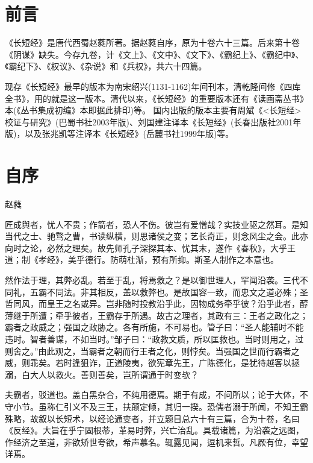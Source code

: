 \chapter*{前言}
《长短经》是唐代西蜀赵蕤所著。据赵蕤自序，原为十卷六十三篇。后来第十卷《阴谋》缺失。今存九卷，计《文上》、《文中》、《文下》、《霸纪上》、《霸纪中》、《霸纪下》、《权议》、《杂说》和《兵权》，共六十四篇。

现存《长短经》最早的版本为南宋绍兴(1131-1162)年间刊本，清乾隆间修《四库全书》，用的就是这一版本。清代以来，《长短经》的重要版本还有《读画斋丛书》本(《丛书集成初编》本即据此排印)等。
国内出版的版本主要有周斌《<长短经>校证与研究》(巴蜀书社2003年版)、刘国建注译本《长短经》(长春出版社2001年版)，以及张兆凯等注译本《长短经》(岳麓书社1999年版)等。



\newpage
\chapter*{自序}
\begin{flushright}
    赵蕤 
\end{flushright}
匠成舆者，忧人不贵；作箭者，恐人不伤。彼岂有爱憎哉？实技业驱之然耳。是知当代之士、驰骛之曹，书读纵横，则思诸侯之变；艺长奇正，则念风尘之会。此亦向时之论，必然之理矣。故先师孔子深探其本、忧其末，遂作《春秋》，大乎王道；制《孝经》，美乎德行。防萌杜渐，预有所抑。斯圣人制作之本意也。

然作法于理，其弊必乱。若至于乱，将焉救之？是以御世理人，罕闻沿袭。三代不同礼，五霸不同法。非其相反，盖以救弊也。是故国容一致，而忠文之道必殊；圣哲同风，而皇王之名或异。岂非随时投教沿乎此，因物成务牵乎彼？沿乎此者，醇薄继于所遭；牵乎彼者，王霸存于所遇。故古之理者，其政有三：王者之政化之；霸者之政威之；强国之政胁之。各有所施，不可易也。管子曰：“圣人能辅时不能违时。智者善谋，不如当时。”邹子曰：“政教文质，所以匡救也。当时则用之，过则舍之。”由此观之，当霸者之朝而行王者之化，则悖矣。当强国之世而行霸者之威，则乖矣。若时逢狙诈，正道陵夷，欲宪章先王，广陈德化，是犹待越客以拯溺，白大人以救火。善则善矣，岂所谓通于时变欤？

夫霸者，驳道也。盖白黑杂合，不纯用德焉。期于有成，不问所以；论于大体，不守小节。虽称仁引义不及三王，扶颠定倾，其归一揆。恐儒者溺于所闻，不知王霸殊略，故叙以长短术，以经论通变者，并立题目总六十有三篇，合为十卷，名曰《反经》。大旨在乎宁固根蒂，革易时弊，兴亡治乱。具载诸篇，为沿袭之远图，作经济之至道，非欲矫世夸欲，希声慕名。辄露见闻，逗机来哲。凡厥有位，幸望详焉。

